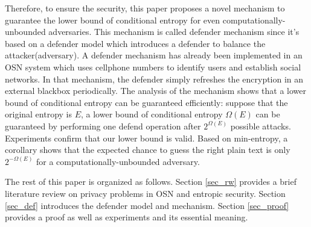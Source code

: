 \documentclass[10pt, conference, compsocconf]{IEEEtran}
\begin{document}
	Therefore, to ensure the security,
	this paper proposes a novel mechanism to guarantee the
	lower bound of conditional entropy for even computationally-unbounded
	adversaries. This mechanism is called defender mechanism
	since it's based on a defender model which introduces
	a defender to balance the attacker(adversary). 
	A defender mechanism has already been implemented
    in an OSN system which uses cellphone numbers
    to identify users and establish social networks.
	In that mechanism, the defender simply refreshes
	the encryption in an external blackbox periodically.
    The analysis of the mechanism shows that a lower bound
    of conditional entropy can be guaranteed efficiently: suppose that the original entropy
    is $E$, a lower bound of conditional entropy $\Omega(E)$ can be guaranteed
    by performing one defend operation after $2^{\Omega(E)}$
    possible attacks.
    Experiments confirm that
    our lower bound is valid. Based on min-entropy, a corollary shows that
    the expected chance to guess the right plain text is only $2^{-\Omega(E)}$ for
    a computationally-unbounded adversary.


    The rest of this paper is organized as follows.
    Section \ref{sec_rw} provides a brief literature review on privacy problems in OSN and
    entropic security. Section \ref{sec_def} introduces the defender model and mechanism.
    Section \ref{sec_proof} provides a proof as well as experiments and its essential meaning.

\end{document}
